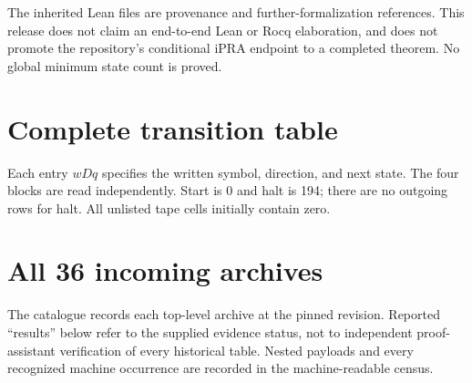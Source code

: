 \documentclass[11pt]{article}
\theoremstyle{definition}
\theoremstyle{remark}
\begin{document}
The inherited Lean files are provenance and further-formalization
references. This release does not claim an end-to-end Lean or Rocq
elaboration, and does not promote the repository's conditional iPRA
endpoint to a completed theorem. No global minimum state count is proved.

\clearpage
\appendix
\section{Complete transition table}\label{app:table}

Each entry $wDq$ specifies the written symbol, direction, and next state.
The four blocks are read independently. Start is 0 and halt is 194;
there are no outgoing rows for halt. All unlisted tape cells initially
contain zero.


\section{All 36 incoming archives}\label{app:archives}

The catalogue records each top-level archive at the pinned revision.
Reported ``results'' below refer to the supplied evidence status, not to
independent proof-assistant verification of every historical table.
Nested payloads and every recognized machine occurrence are recorded in
the machine-readable census.

\end{document}
